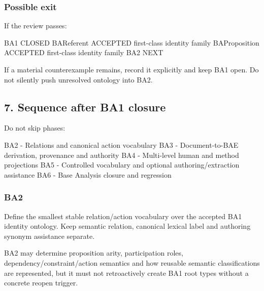 \documentclass[
  10pt,
]{article}
\newenvironment{Shaded}{}{}
\newcommand{\NormalTok}[1]{#1}
\begin{document}
\subsubsection{Possible exit}\label{possible-exit}

If the review passes:

\begin{Shaded}
\begin{Highlighting}[]
\NormalTok{BA1 CLOSED}
\NormalTok{BAReferent ACCEPTED first{-}class identity family}
\NormalTok{BAProposition ACCEPTED first{-}class identity family}
\NormalTok{BA2 NEXT}
\end{Highlighting}
\end{Shaded}

If a material counterexample remains, record it explicitly and keep BA1
open. Do not silently push unresolved ontology into BA2.

\subsection{7. Sequence after BA1
closure}\label{sequence-after-ba1-closure}

Do not skip phases:

\begin{Shaded}
\begin{Highlighting}[]
\NormalTok{BA2 {-} Relations and canonical action vocabulary}
\NormalTok{BA3 {-} Document{-}to{-}BAE derivation, provenance and authority}
\NormalTok{BA4 {-} Multi{-}level human and method projections}
\NormalTok{BA5 {-} Controlled vocabulary and optional authoring/extraction assistance}
\NormalTok{BA6 {-} Base Analysis closure and regression}
\end{Highlighting}
\end{Shaded}

\subsubsection{BA2}\label{ba2}

Define the smallest stable relation/action vocabulary over the accepted
BA1 identity ontology. Keep semantic relation, canonical lexical label
and authoring synonym assistance separate.

BA2 may determine proposition arity, participation roles,
dependency/constraint/action semantics and how reusable semantic
classifications are represented, but it must not retroactively create
BA1 root types without a concrete reopen trigger.
\end{document}
